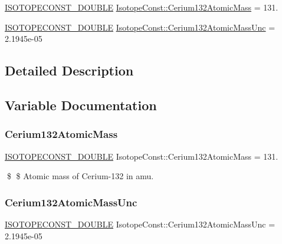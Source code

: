\begin{DoxyCompactItemize}
\item 
\mbox{\hyperlink{group___isotope_const-_macros_ga8f45a7272ce02c0b4c65c44636ed719a}{I\+S\+O\+T\+O\+P\+E\+C\+O\+N\+S\+T\+\_\+\+D\+O\+U\+B\+LE}} \mbox{\hyperlink{group___isotope_const-_cerium-_ce132_ga49236bababfef6164c3ed7ec04b686da}{Isotope\+Const\+::\+Cerium132\+Atomic\+Mass}} = 131.
\item 
\mbox{\hyperlink{group___isotope_const-_macros_ga8f45a7272ce02c0b4c65c44636ed719a}{I\+S\+O\+T\+O\+P\+E\+C\+O\+N\+S\+T\+\_\+\+D\+O\+U\+B\+LE}} \mbox{\hyperlink{group___isotope_const-_cerium-_ce132_ga5b6942dda4e20a0f2559256cbd77b0d4}{Isotope\+Const\+::\+Cerium132\+Atomic\+Mass\+Unc}} = 2.\+1945e-\/05
\end{DoxyCompactItemize}


\subsection{Detailed Description}


\subsection{Variable Documentation}
\mbox{\label{group___isotope_const-_cerium-_ce132_ga49236bababfef6164c3ed7ec04b686da}} 
\subsubsection{\texorpdfstring{Cerium132\+Atomic\+Mass}{Cerium132AtomicMass}}
{\footnotesize\ttfamily \mbox{\hyperlink{group___isotope_const-_macros_ga8f45a7272ce02c0b4c65c44636ed719a}{I\+S\+O\+T\+O\+P\+E\+C\+O\+N\+S\+T\+\_\+\+D\+O\+U\+B\+LE}} Isotope\+Const\+::\+Cerium132\+Atomic\+Mass = 131.}

\$ \$ Atomic mass of Cerium-\/132 in amu. \mbox{\label{group___isotope_const-_cerium-_ce132_ga5b6942dda4e20a0f2559256cbd77b0d4}} 
\subsubsection{\texorpdfstring{Cerium132\+Atomic\+Mass\+Unc}{Cerium132AtomicMassUnc}}
{\footnotesize\ttfamily \mbox{\hyperlink{group___isotope_const-_macros_ga8f45a7272ce02c0b4c65c44636ed719a}{I\+S\+O\+T\+O\+P\+E\+C\+O\+N\+S\+T\+\_\+\+D\+O\+U\+B\+LE}} Isotope\+Const\+::\+Cerium132\+Atomic\+Mass\+Unc = 2.\+1945e-\/05}

